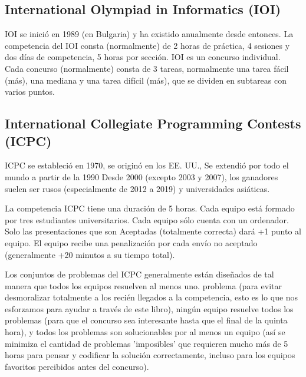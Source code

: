 \subsection{International Olympiad in Informatics (IOI)}

IOI se inició en 1989 (en Bulgaria) y ha existido anualmente desde entonces. La competencia del IOI consta (normalmente) de 2 horas de práctica, 4 sesiones y dos días de competencia, 5 horas
por sección. IOI es un concurso individual. Cada concurso (normalmente) consta de 3 tareas, normalmente
una tarea fácil (más), una mediana y una tarea difícil (más), que se dividen en subtareas
con varios puntos.

\subsection{International Collegiate Programming Contests (ICPC)}

ICPC se estableció en 1970, se originó en los EE. UU., Se extendió por todo el mundo a partir de la
1990 Desde 2000 (excepto 2003 y 2007), los ganadores suelen ser rusos (especialmente de 2012 a 2019) y universidades asiáticas.

La competencia ICPC tiene una duración de 5 horas. Cada equipo está formado por tres estudiantes universitarios. Cada equipo sólo cuenta con un ordenador. Solo las presentaciones que son Aceptadas (totalmente correcta) dará +1 punto al equipo. El equipo recibe una penalización por cada envío no aceptado (generalmente +20 minutos a su tiempo total). 

Los conjuntos de problemas del ICPC generalmente están diseñados de tal manera que todos los equipos resuelven al menos uno.
problema (para evitar desmoralizar totalmente a los recién llegados a la competencia, esto es lo que nos esforzamos
para ayudar a través de este libro), ningún equipo resuelve todos los problemas (para que el concurso sea interesante hasta que el
final de la quinta hora), y todos los problemas son solucionables por al menos un equipo (así se minimiza el
cantidad de problemas 'imposibles' que requieren mucho más de 5 horas para pensar y codificar
la solución correctamente, incluso para los equipos favoritos percibidos antes del concurso).